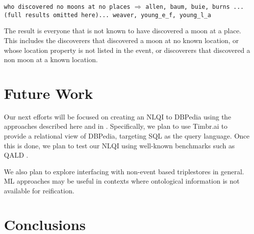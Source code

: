 \documentclass[../main.tex]{subfiles}
\begin{document}
\begin{refsection}
\examplespacing

\texttt{who discovered no moons at no places} $\Rightarrow$ \texttt{allen, baum, buie, burns ...(full results omitted here)... weaver, young\_e\_f, young\_l\_a}

\examplespacing

\noindent The result is everyone that is not known to have discovered a moon at a place.  This includes the discoverers that discovered a moon at no known location, or whose location property is not listed in the event, or discoverers that discovered a non moon at a known location.

\examplespacing

\section{Future Work}
\label{webist2020conf:future}

\noindent Our next efforts will be focused on creating an NLQI to DBPedia using the approaches
described here and in \cite{peelar2020webistjournal}.  Specifically, we plan to use Timbr.ai \cite{timbr} to provide a relational view of DBPedia, targeting SQL as the query language.
Once this is done, we plan to test our NLQI using well-known benchmarks such as QALD \cite{qald9}.

We also plan to explore interfacing with non-event based triplestores in general.  ML approaches may be useful in contexts where ontological information is not available for reification.


\section{Conclusions}
\label{webist2020conf:conclusion}


\end{refsection}
\end{document}
